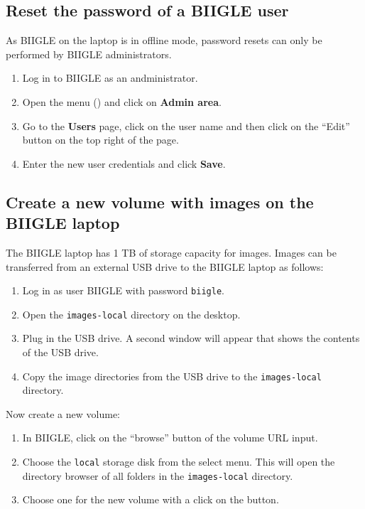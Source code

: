 \subsection*{Reset the password of a BIIGLE user}

As BIIGLE on the laptop is in offline mode, password resets can only be performed by BIIGLE administrators.

\begin{enumerate}
    \item Log in to BIIGLE as an andministrator.
    \item Open the menu () and click on \textbf{Admin area}.
    \item Go to the \textbf{Users} page, click on the user name and then click on the ``Edit'' button on the top right of the page.
    \item Enter the new user credentials and click \textbf{Save}.
\end{enumerate}

\subsection*{Create a new volume with images on the BIIGLE laptop}

The BIIGLE laptop has 1 TB of storage capacity for images. Images can be transferred from an external USB drive to the BIIGLE laptop as follows:

\begin{enumerate}
    \item Log in as user BIIGLE with password \texttt{biigle}.
    \item Open the \texttt{images-local} directory on the desktop.
    \item Plug in the USB drive. A second window will appear that shows the contents of the USB drive.
    \item Copy the image directories from the USB drive to the \texttt{images-local} directory.
\end{enumerate}

Now create a new volume:

\begin{enumerate}
    \item In BIIGLE, click on the ``browse'' button of the volume URL input.
    \item Choose the \texttt{local} storage disk from the select menu. This will open the directory browser of all folders in the \texttt{images-local} directory.
    \item Choose one for the new volume with a click on the  button.
\end{enumerate}

